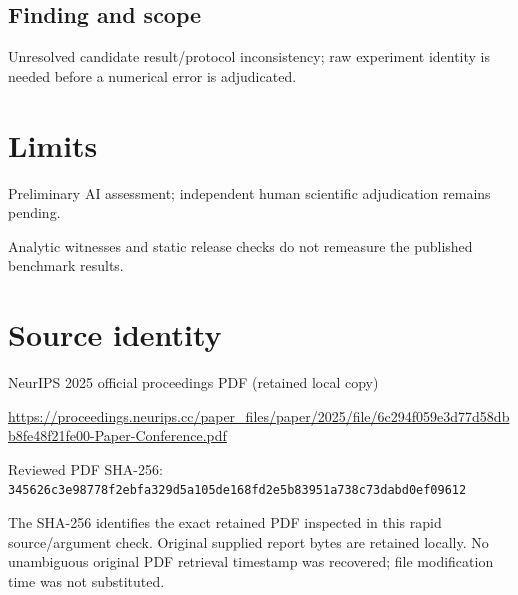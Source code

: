 \documentclass[11pt]{article}
\begin{document}
\subsection*{Finding and scope}

Unresolved candidate result/protocol inconsistency; raw experiment identity is needed before a numerical error is adjudicated.

\section*{Limits}

Preliminary AI assessment; independent human scientific adjudication remains pending.\par

Analytic witnesses and static release checks do not remeasure the published benchmark results.\par

\section*{Source identity}

NeurIPS 2025 official proceedings PDF (retained local copy)

\url{https://proceedings.neurips.cc/paper_files/paper/2025/file/6c294f059e3d77d58dbb8fe48f21fe00-Paper-Conference.pdf}

Reviewed PDF SHA-256: \nolinkurl{345626c3e98778f2ebfa329d5a105de168fd2e5b83951a738c73dabd0ef09612}

The SHA-256 identifies the exact retained PDF inspected in this rapid source/argument check. Original supplied report bytes are retained locally. No unambiguous original PDF retrieval timestamp was recovered; file modification time was not substituted.
\end{document}
